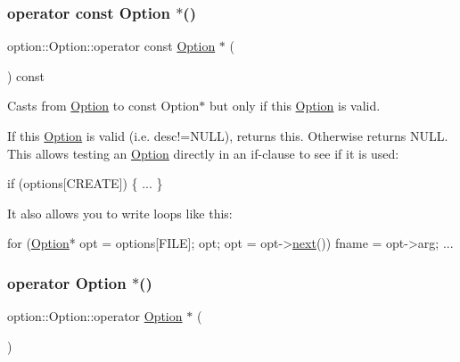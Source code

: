 \subsubsection{\texorpdfstring{operator const Option $\ast$()}{operator const Option *()}}
{\footnotesize\ttfamily option\+::\+Option\+::operator const \hyperlink{classoption_1_1Option}{Option} $\ast$ (\begin{DoxyParamCaption}{ }\end{DoxyParamCaption}) const\hspace{0.3cm}{\ttfamily [inline]}}



Casts from \hyperlink{classoption_1_1Option}{Option} to const Option$\ast$ but only if this \hyperlink{classoption_1_1Option}{Option} is valid. 

If this \hyperlink{classoption_1_1Option}{Option} is valid (i.\+e. {\ttfamily desc!=N\+U\+LL}), returns this. Otherwise returns N\+U\+LL. This allows testing an \hyperlink{classoption_1_1Option}{Option} directly in an if-\/clause to see if it is used\+: 
\begin{DoxyCode}
\textcolor{keywordflow}{if} (options[CREATE])
\{
  ...
\}
\end{DoxyCode}
 It also allows you to write loops like this\+: 
\begin{DoxyCode}
\textcolor{keywordflow}{for} (\hyperlink{classoption_1_1Option_aa2810152fc23b14175b115d1a7d38095}{Option}* opt = options[FILE]; opt; opt = opt->\hyperlink{classoption_1_1Option_a59ae9aed505f4d410633bb36478a32be}{next}())
 fname = opt->arg; ... 
\end{DoxyCode}
 \mbox{\label{classoption_1_1Option_ac5b9235d79208035d97e41fe17ba04d6}} 
\subsubsection{\texorpdfstring{operator Option $\ast$()}{operator Option *()}}
{\footnotesize\ttfamily option\+::\+Option\+::operator \hyperlink{classoption_1_1Option}{Option} $\ast$ (\begin{DoxyParamCaption}{ }\end{DoxyParamCaption})\hspace{0.3cm}{\ttfamily [inline]}}



